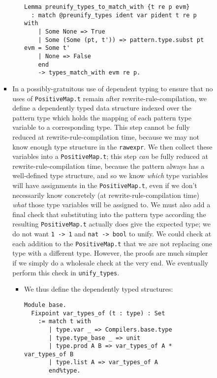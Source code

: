 \documentclass[
]{article}
\begin{document}
\begin{itemize}
\begin{itemize}
\begin{itemize}
\begin{itemize}
\begin{itemize}
\begin{verbatim}
Lemma preunify_types_to_match_with {t re p evm}
  : match @preunify_types ident var pident t re p with
    | Some None => True
    | Some (Some (pt, t')) => pattern.type.subst pt evm = Some t'
    | None => False
    end
    -> types_match_with evm re p.
\end{verbatim}
        \end{itemize}
      \item
        In a possibly-gratuitous use of dependent typing to ensure that
        no uses of \texttt{PositiveMap.t} remain after
        rewrite-rule-compilation, we define a dependently typed data
        structure indexed over the pattern type which holds the mapping
        of each pattern type variable to a corresponding type. This step
        cannot be fully reduced at rewrite-rule-compilation time,
        because we may not know enough type structure in the
        \texttt{rawexpr}. We then collect these variables into a
        \texttt{PositiveMap.t}; this step \emph{can} be fully reduced at
        rewrite-rule-compilation time, because the pattern always has a
        well-defined type structure, and so we know \emph{which} type
        variables will have assignments in the \texttt{PositiveMap.t},
        even if we don't necessarily know concretely (at
        rewrite-rule-compilation time) \emph{what} those type variables
        will be assigned to. We must also add a final check that
        substituting into the pattern type according the resulting
        \texttt{PositiveMap.t} actually does give the expected type; we
        do not want
        \texttt{\textquotesingle{}1\ -\textgreater{}\ \textquotesingle{}1}
        and \texttt{nat\ -\textgreater{}\ bool} to unify. We could check
        at each addition to the \texttt{PositiveMap.t} that we are not
        replacing one type with a different type. However, the proofs
        are much simpler if we simply do a wholesale check at the very
        end. We eventually perform this check in \texttt{unify\_types}.

        \begin{itemize}
        \item
          We thus define the dependently typed structures:

\begin{verbatim}
Module base.
  Fixpoint var_types_of (t : type) : Set
    := match t with
       | type.var _ => Compilers.base.type
       | type.type_base _ => unit
       | type.prod A B => var_types_of A * var_types_of B
       | type.list A => var_types_of A
       end%type.


\end{verbatim}
\end{itemize}
\end{itemize}
\end{itemize}
\end{itemize}
\end{itemize}
\end{document}
